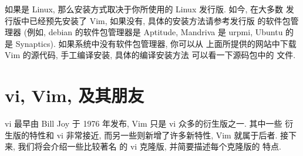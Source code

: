 如果是 Linux, 那么安装方式取决于你所使用的 Linux 发行版. 如今, 在大多数
发行版中已经预先安装了 Vim, 如果没有, 具体的安装方法请参考发行版
的软件包管理器 (例如, debian 的软件包管理器是 Aptitude, Mandriva 是
urpmi, Ubuntu 的是 Synaptics). 如果系统中没有软件包管理器, 你可以从
上面所提供的网站中下载 Vim 的源代码, 手工编译安装, 具体的编译安装方法
可以看一下源码包中的  文件.

\section{vi, Vim, 及其朋友}
\label{sec:vi_vim_and_friends}
vi 最早由 Bill Joy 于 1976 年发布, Vim 只是 vi 众多的衍生版之一. 其中一些
衍生版的特性和 vi 非常接近, 而另一些则新增了许多新特性, Vim 就属于后者.
接下来, 我们将会介绍一些比较著名 的 vi 克隆版, 并简要描述每个克隆版的
特点.
